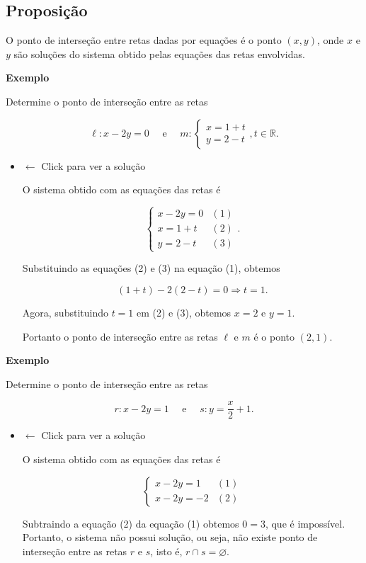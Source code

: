 \documentclass[
  brazilian,
  letterpaper,
  DIV=11,
  numbers=noendperiod]{scrreprt}
\theoremstyle{definition}
\theoremstyle{plain}
\theoremstyle{definition}
\theoremstyle{remark}
\begin{document}
\subsection{Proposição}\label{proposiuxe7uxe3o-12}

O ponto de interseção entre retas dadas por equações é o ponto
\((x,y)\), onde \(x\) e \(y\) são soluções do sistema obtido pelas
equações das retas envolvidas.

\textbf{Exemplo}

Determine o ponto de interseção entre as retas

\[
 \ell: x-2y=0 \quad \text{ e } \quad m: \left\{ \begin{array}{l} x= 1+t \\ y =2 -t\end{array} \right. , t \in \mathbb{R}.
\]

\begin{itemize}
\item
  \(\leftarrow\) Click para ver a solução

  O sistema obtido com as equações das retas é

  \[
    \left\{ \begin{array}{lc}
    x-2y=0 & (1) \\
    x=1+t & (2) \\
    y= 2-t & (3)
    \end{array}\right..
    \]

  Substituindo as equações (2) e (3) na equação (1), obtemos

  \[
    (1+t)-2(2-t)=0 \Rightarrow t=1.
    \]

  Agora, substituindo \(t=1\) em (2) e (3), obtemos \(x=2\) e \(y=1\).

  Portanto o ponto de interseção entre as retas \(\ell\) e \(m\) é o
  ponto \((2,1)\).
\end{itemize}

\textbf{Exemplo}

Determine o ponto de interseção entre as retas

\[
 r:x-2y=1  \quad \text{ e } \quad   s:y=\frac{x}{2}+1.
\]

\begin{itemize}
\item
  \(\leftarrow\) Click para ver a solução

  O sistema obtido com as equações das retas é

  \[
    \left\{ \begin{array}{lr}
    x-2y=1 & (1) \\
    x-2y=-2 & (2)
    \end{array} \right.
    \]

  Subtraindo a equação (2) da equação (1) obtemos \(0=3\), que é
  impossível. Portanto, o sistema não possui solução, ou seja, não
  existe ponto de interseção entre as retas \(r\) e \(s\), isto é,
  \(r\cap s=\varnothing\).
\end{itemize}
\end{document}
